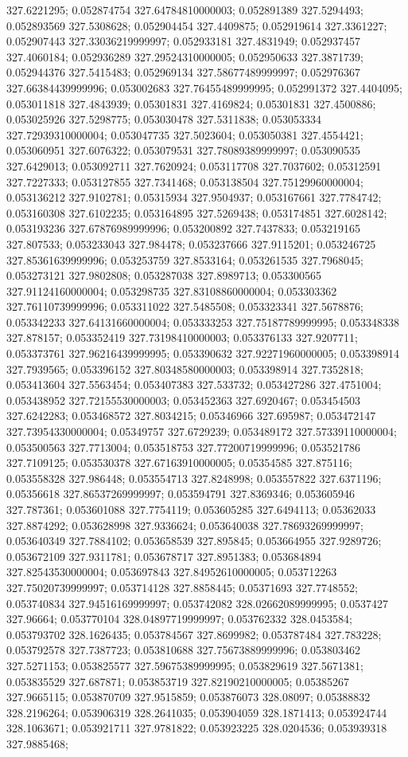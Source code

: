 327.6221295; 0.052874754 327.64784810000003; 0.052891389 327.5294493; 0.052893569 327.5308628; 0.052904454 327.4409875; 0.052919614 327.3361227; 0.052907443 327.33036219999997; 0.052933181 327.4831949; 0.052937457 327.4060184; 0.052936289 327.29524310000005; 0.052950633 327.3871739; 0.052944376 327.5415483; 0.052969134 327.58677489999997; 0.052976367 327.66384439999996; 0.053002683 327.76455489999995; 0.052991372 327.4404095; 0.053011818 327.4843939; 0.05301831 327.4169824; 0.05301831 327.4500886; 0.053025926 327.5298775; 0.053030478 327.5311838; 0.053053334 327.72939310000004; 0.053047735 327.5023604; 0.053050381 327.4554421; 0.053060951 327.6076322; 0.053079531 327.78089389999997; 0.053090535 327.6429013; 0.053092711 327.7620924; 0.053117708 327.7037602; 0.05312591 327.7227333; 0.053127855 327.7341468; 0.053138504 327.75129960000004; 0.053136212 327.9102781; 0.05315934 327.9504937; 0.053167661 327.7784742; 0.053160308 327.6102235; 0.053164895 327.5269438; 0.053174851 327.6028142; 0.053193236 327.67876989999996; 0.053200892 327.7437833; 0.053219165 327.807533; 0.053233043 327.984478; 0.053237666 327.9115201; 0.053246725 327.85361639999996; 0.053253759 327.8533164; 0.053261535 327.7968045; 0.053273121 327.9802808; 0.053287038 327.8989713; 0.053300565 327.91124160000004; 0.053298735 327.83108860000004; 0.053303362 327.76110739999996; 0.053311022 327.5485508; 0.053323341 327.5678876; 0.053342233 327.64131660000004; 0.053333253 327.75187789999995; 0.053348338 327.878157; 0.053352419 327.73198410000003; 0.053376133 327.9207711; 0.053373761 327.96216439999995; 0.053390632 327.92271960000005; 0.053398914 327.7939565; 0.053396152 327.80348580000003; 0.053398914 327.7352818; 0.053413604 327.5563454; 0.053407383 327.533732; 0.053427286 327.4751004; 0.053438952 327.72155530000003; 0.053452363 327.6920467; 0.053454503 327.6242283; 0.053468572 327.8034215; 0.05346966 327.695987; 0.053472147 327.73954330000004; 0.05349757 327.6729239; 0.053489172 327.57339110000004; 0.053500563 327.7713004; 0.053518753 327.77200719999996; 0.053521786 327.7109125; 0.053530378 327.67163910000005; 0.05354585 327.875116; 0.053558328 327.986448; 0.053554713 327.8248998; 0.053557822 327.6371196; 0.05356618 327.86537269999997; 0.053594791 327.8369346; 0.053605946 327.787361; 0.053601088 327.7754119; 0.053605285 327.6494113; 0.05362033 327.8874292; 0.053628998 327.9336624; 0.053640038 327.78693269999997; 0.053640349 327.7884102; 0.053658539 327.895845; 0.053664955 327.9289726; 0.053672109 327.9311781; 0.053678717 327.8951383; 0.053684894 327.82543530000004; 0.053697843 327.84952610000005; 0.053712263 327.75020739999997; 0.053714128 327.8858445; 0.05371693 327.7748552; 0.053740834 327.94516169999997; 0.053742082 328.02662089999995; 0.0537427 327.96664; 0.053770104 328.04897719999997; 0.053762332 328.0453584; 0.053793702 328.1626435; 0.053784567 327.8699982; 0.053787484 327.783228; 0.053792578 327.7387723; 0.053810688 327.75673889999996; 0.053803462 327.5271153; 0.053825577 327.59675389999995; 0.053829619 327.5671381; 0.053835529 327.687871; 0.053853719 327.82190210000005; 0.05385267 327.9665115; 0.053870709 327.9515859; 0.053876073 328.08097; 0.05388832 328.2196264; 0.053906319 328.2641035; 0.053904059 328.1871413; 0.053924744 328.1063671; 0.053921711 327.9781822; 0.053923225 328.0204536; 0.053939318 327.9885468; 